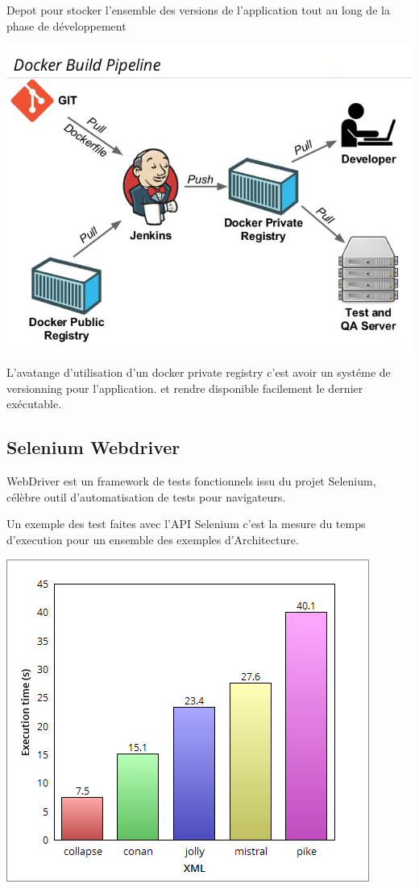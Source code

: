 \documentclass [a4paper,11pt]{article}
\begin{document}
Depot pour stocker l'ensemble des versions de l'application tout au long de la phase de développement

\begin{center}
\includegraphics[scale=0.4]{img/registry.png}
\end{center}

L'avatange d'utilisation d'un docker private registry c'est avoir un systéme de versionning pour l'application. et rendre disponible facilement le dernier exécutable.
\subsection{Selenium Webdriver}
WebDriver est un framework de tests fonctionnels issu du projet Selenium, célèbre outil d'automatisation de tests pour navigateurs.\newline

Un exemple des test faites avec l'API Selenium c'est la mesure du temps d'execution pour un ensemble des exemples d'Architecture.

\begin{center}
\includegraphics[scale=0.4]{img/benchmark.png}
\end{center}
\end{document}
